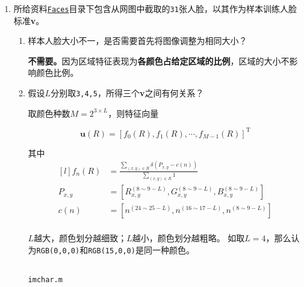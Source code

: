 \documentclass{article}
\numberwithin{figure}{section}
\numberwithin{table}{section}
\numberwithin{listing}{section}
\numberwithin{equation}{section}
\begin{document}
        \begin{enumerate}
            \item 所给资料\href{../resource/Faces}{\texttt{Faces}}目录下包含从网图中截取的\texttt{31}张人脸，以其作为样本训练人脸标准\textbf{v}。

                \begin{enumerate}
                    \item 样本人脸大小不一，是否需要首先将图像调整为相同大小？

                        \textbf{不需要。}因为区域特征表现为\textbf{各颜色占给定区域的比例}，区域的大小不影响颜色比例。

                    \item 假设$L$分别取\texttt{3,4,5}，所得三个\textbf{v}之间有何关系？

                        取颜色种数$M=2^{3\times L}$，则特征向量

                        \begin{equation}
                            \mathbf{u}(R)=\left[f_0(R),f_1(R),\cdots,f_{M-1}(R)\right]^\text{T}
                        \end{equation}

                        其中
                        \[
                            \begin{matrix*}[l]
                                f_n(R) &= \frac{\sum_{(x,y)\in R} \delta (P_{x,y}-c(n))}{\sum_{(x,y)\in R}1} \\

                                P_{x,y} &= \left[ R_{x,y}^{(8\sim 9-L)}, G_{x,y}^{(8\sim 9-L)}, B_{x,y}^{(8\sim 9-L)} \right] \\

                                c(n) &= \left[ n^{(24\sim 25-L)}, n^{(16\sim 17-L)}, n^{(8\sim 9-L)} \right] \\
                            \end{matrix*}
                        \]

                        $L$越大，颜色划分越细致；$L$越小，颜色划分越粗略。
                        如取$L=4$，那么认为\texttt{RGB(0,0,0)}和\texttt{RGB(15,0,0)}是同一种颜色。

                        \begin{listing}[H]
                            \inputminted{matlab}{../imchar.m}
                            \caption{\texttt{imchar.m}}
                        \end{listing}


\end{enumerate}
\end{enumerate}
\end{document}
